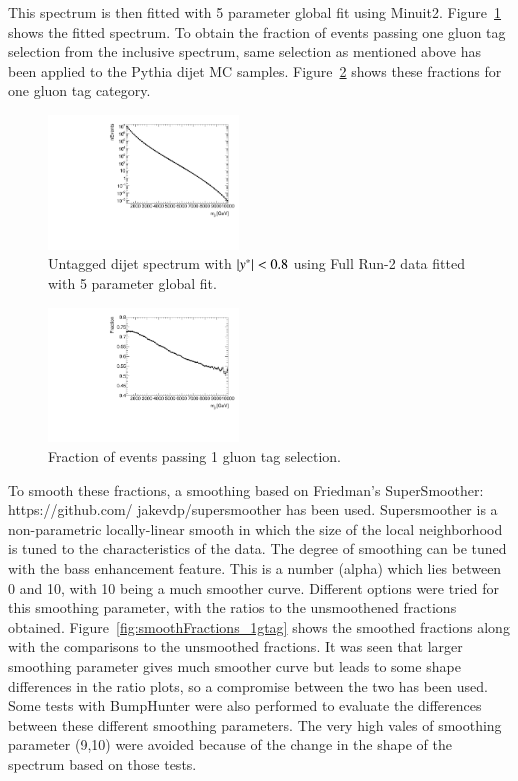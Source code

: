This spectrum is then fitted with 5 parameter global fit using Minuit2. Figure~\ref{fig:mjjFit_ystar0p8} shows the fitted spectrum.
To obtain the fraction of events passing one gluon tag selection from the inclusive
spectrum, same selection as mentioned above has been applied to the Pythia dijet MC samples.
Figure~\ref{fig:fraction_1gtag_unsmooth} shows these fractions for one gluon tag category.

 \begin{figure}[!htb]
   \centering
   \includegraphics[width=0.45\textwidth]{figures/pseudodata/FittedMjj_UntaggedData_yStar0p8}
   \caption{Untagged dijet spectrum with $|y^\ast|<0.8$ using Full Run-2 data fitted with 5 parameter global fit.
   \label{fig:mjjFit_ystar0p8}}
 \end{figure}

 \begin{figure}[!htb]
   \centering
   \includegraphics[width=0.45\textwidth]{figures/pseudodata/FractionUnsmooth_1gtag_yStar0p8}
   \caption{Fraction of events passing 1 gluon tag selection.
   \label{fig:fraction_1gtag_unsmooth}}
 \end{figure}


To smooth these fractions, a smoothing based on Friedman's SuperSmoother: https://github.com/
jakevdp/supersmoother has been used. Supersmoother is a non-parametric locally-linear smooth in which the size of the local neighborhood is tuned 
to the characteristics of the data. The degree of smoothing can be tuned with the bass enhancement feature.
This is a number (alpha) which lies between 0 and 10, with 10 being a much smoother curve. Different options were tried
for this smoothing parameter, with the ratios to the unsmoothened fractions obtained. Figure~\ref{fig:smoothFractions_1gtag} shows 
the smoothed fractions along with the comparisons to the unsmoothed fractions. It was seen that larger smoothing 
parameter gives much smoother curve but leads to some shape differences in the ratio plots, so a compromise between the two 
has been used. Some tests with BumpHunter were also performed to evaluate the differences between these different 
smoothing parameters. The very high vales of smoothing parameter (9,10) were avoided because of the change in the 
shape of the spectrum based on those tests.

